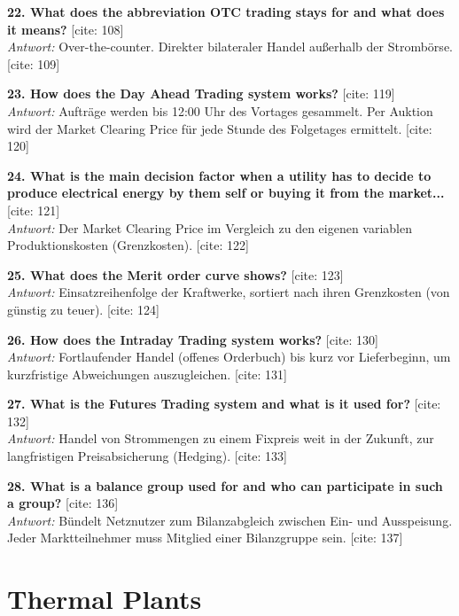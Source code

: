 \documentclass[11pt,a4paper]{article}
\begin{document}
\vspace{0.5cm}
\textbf{22. What does the abbreviation OTC trading stays for and what does it means?} [cite: 108]\\
\textit{Antwort:} Over-the-counter. Direkter bilateraler Handel außerhalb der Strombörse. [cite: 109]

\vspace{0.5cm}
\textbf{23. How does the Day Ahead Trading system works?} [cite: 119]\\
\textit{Antwort:} Aufträge werden bis 12:00 Uhr des Vortages gesammelt. Per Auktion wird der Market Clearing Price für jede Stunde des Folgetages ermittelt. [cite: 120]

\vspace{0.5cm}
\textbf{24. What is the main decision factor when a utility has to decide to produce electrical energy by them self or buying it from the market...} [cite: 121]\\
\textit{Antwort:} Der Market Clearing Price im Vergleich zu den eigenen variablen Produktionskosten (Grenzkosten). [cite: 122]

\vspace{0.5cm}
\textbf{25. What does the Merit order curve shows?} [cite: 123]\\
\textit{Antwort:} Einsatzreihenfolge der Kraftwerke, sortiert nach ihren Grenzkosten (von günstig zu teuer). [cite: 124]

\vspace{0.5cm}
\textbf{26. How does the Intraday Trading system works?} [cite: 130]\\
\textit{Antwort:} Fortlaufender Handel (offenes Orderbuch) bis kurz vor Lieferbeginn, um kurzfristige Abweichungen auszugleichen. [cite: 131]

\vspace{0.5cm}
\textbf{27. What is the Futures Trading system and what is it used for?} [cite: 132]\\
\textit{Antwort:} Handel von Strommengen zu einem Fixpreis weit in der Zukunft, zur langfristigen Preisabsicherung (Hedging). [cite: 133]

\vspace{0.5cm}
\textbf{28. What is a balance group used for and who can participate in such a group?} [cite: 136]\\
\textit{Antwort:} Bündelt Netznutzer zum Bilanzabgleich zwischen Ein- und Ausspeisung. Jeder Marktteilnehmer muss Mitglied einer Bilanzgruppe sein. [cite: 137]

\section*{Thermal Plants}
\end{document}
